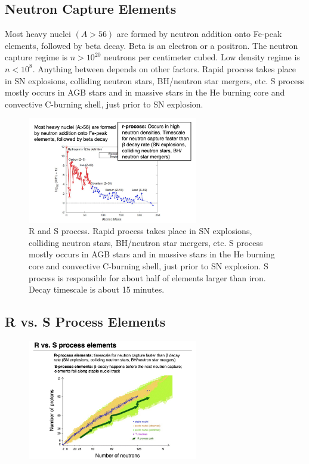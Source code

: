 \documentclass{article}
\begin{document}
\subsection{Neutron Capture Elements}

Most heavy nuclei $(A>56)$ are formed by neutron addition onto Fe-peak elements, followed by beta decay. Beta is an electron or a positron. The neutron capture regime is $n > 10^{20}$ neutrons per centimeter cubed. Low density regime is $n < 10^{8}$. Anything between depends on other factors. Rapid process takes place in SN explosions, colliding neutron stars, BH/neutron star mergers, etc. S process mostly occurs in AGB stars and in massive stars in the He burning core and convective C-burning shell, just prior to SN explosion. 

\begin{figure}
    \centering
    \includegraphics[width=0.66\textwidth]{figs/Screen Shot 2021-10-06 at 10.20.30 AM.png}
    \caption{R and S process. Rapid process takes place in SN explosions, colliding neutron stars, BH/neutron star mergers, etc. S process mostly occurs in AGB stars and in massive stars in the He burning core and convective C-burning shell, just prior to SN explosion. S process is responsible for about half of elements larger than iron. Decay timescale is about 15 minutes. }
    \label{fig:R_S}
\end{figure}

\subsection{R vs. S Process Elements}

\begin{figure}
    \centering
    \includegraphics[width=0.66\textwidth]{figs/Screen Shot 2021-10-06 at 10.24.20 AM.png}
    \caption{}
    \label{fig:rs_stability}
\end{figure}
\end{document}
